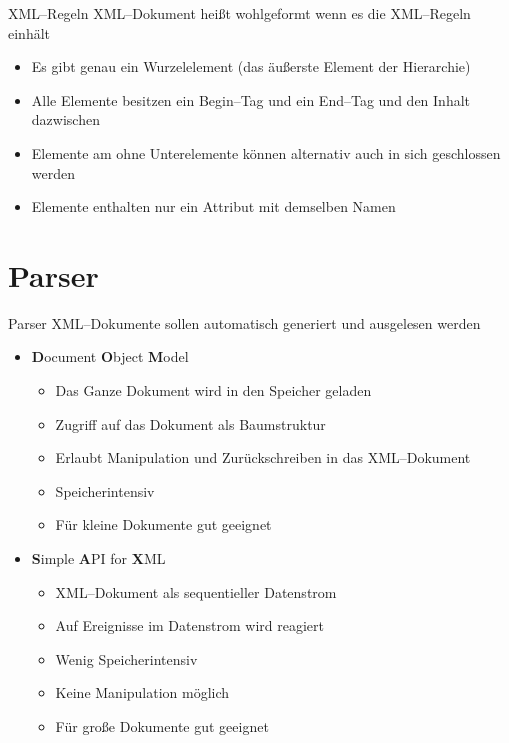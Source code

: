 \documentclass{beamer}
\begin{document}
\begin{frame}{XML--Regeln}
  XML--Dokument heißt \alert{wohlgeformt} wenn es die XML--Regeln einhält
  \begin{itemize}
    \item  Es gibt genau ein \alert{Wurzelelement} (das äußerste Element der Hierarchie)
    \item  Alle Elemente besitzen ein \alert{Begin--Tag} und ein \alert{End--Tag} und den Inhalt dazwischen	   
    \item  Elemente am ohne Unterelemente können alternativ auch in sich geschlossen werden 
    \item  Elemente enthalten nur ein Attribut mit demselben Namen
  \end{itemize}
\end{frame}

\section{Parser}

\begin{frame}{Parser}
XML--Dokumente sollen automatisch generiert und ausgelesen werden
\begin{itemize}
  \item  \textbf{D}ocument \textbf{O}bject \textbf{M}odel
    \begin{itemize}
      \item  Das Ganze Dokument wird in den Speicher geladen
      \item  Zugriff auf das Dokument als Baumstruktur
      \item  Erlaubt Manipulation und Zurückschreiben in das XML--Dokument
      \item  Speicherintensiv
      \item  Für kleine Dokumente gut geeignet
    \end{itemize}
  \item  \textbf{S}imple \textbf{A}PI for \textbf{X}ML
    \begin{itemize}
      \item  XML--Dokument als sequentieller Datenstrom
      \item  Auf Ereignisse im Datenstrom wird reagiert
      \item  Wenig Speicherintensiv
      \item  Keine Manipulation möglich
      \item  Für große Dokumente gut geeignet
    \end{itemize}
\end{itemize}
\end{frame}

\end{document}
